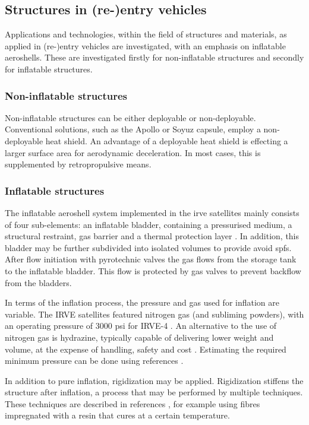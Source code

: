 \subsection{Structures in (re-)entry vehicles}\label{sec:struc}
Applications and technologies, within the field of structures and materials, as applied in (re-)entry vehicles are investigated, with an emphasis on inflatable aeroshells. These are investigated firstly for non-inflatable structures and secondly for inflatable structures.

\subsubsection{Non-inflatable structures}
Non-inflatable structures can be either deployable or non-deployable. Conventional solutions, such as the Apollo or Soyuz capsule, employ a non-deployable heat shield. An advantage of a deployable heat shield is effecting a larger surface area for aerodynamic deceleration. In most cases, this is supplemented by retropropulsive means.



\subsubsection{Inflatable structures}
The inflatable aeroshell system implemented in the \gls{irve} satellites mainly consists of four sub-elements: an inflatable bladder, containing a pressurised medium, a structural restraint, gas barrier and a thermal protection layer \cite{Hughes2005}. In addition, this bladder may be further subdivided into isolated volumes to provide avoid \gls{spfs}. After flow initiation with pyrotechnic valves the gas flows from the storage tank to the inflatable bladder. This flow is protected by gas valves to prevent backflow from the bladders. \cite{Hughes2005} 

In terms of the inflation process, the pressure and gas used for inflation are variable. The IRVE satellites featured nitrogen gas (and subliming powders), with an operating pressure of 3000 psi for IRVE-4 \cite{Litton2011}. An alternative to the use of nitrogen gas is hydrazine, typically capable of delivering lower weight and volume, at the expense of handling, safety and cost \cite{Freeland1998}. Estimating the required minimum pressure can be done using references \cite{Samareh2011, Brown2009}.

In addition to pure inflation, rigidization may be applied. Rigidization stiffens the structure after inflation, a process that may be performed by multiple techniques. These techniques are described in references \cite{Freeland1998,Jenkins2001}, for example using fibres impregnated with a resin that cures at a certain temperature. 

